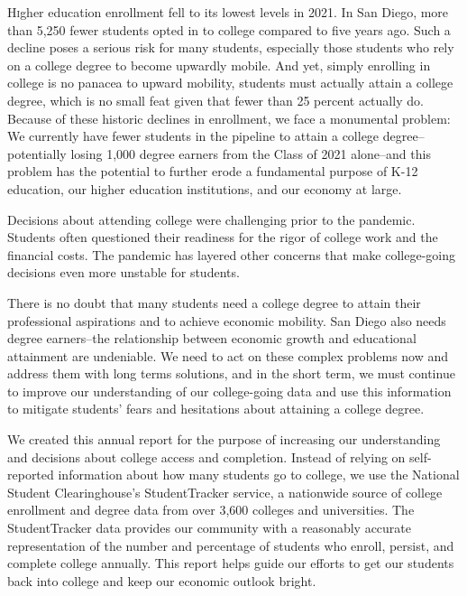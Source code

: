 \documentclass[
  11pt,
]{article}
\author{}
\date{\vspace{-2.5em}}
\begin{document}
\raggedright

\sdcoelogo{}

\vspace{5mm}

\vspace{5mm}
\begin{adjustwidth}{50pt}{50pt}
\lettrine[lines=3, lraise=0.2, nindent=0em, slope=0em]{H}igher education enrollment fell to its lowest levels in 2021. In San Diego, more than 5,250 fewer students opted in to college compared to five years ago. Such a decline poses a serious risk for many students, especially those students who rely on a college degree to become upwardly mobile. And yet, simply enrolling in college is no panacea to upward mobility, students must actually attain a college degree, which is no small feat given that fewer than 25 percent actually do. Because of these historic declines in enrollment, we face a monumental problem: We currently have fewer students in the pipeline to attain a college degree--potentially losing 1,000 degree earners from the Class of 2021 alone--and this problem has the potential to further erode a fundamental purpose of K-12 education, our higher education institutions, and our economy at large.

Decisions about attending college were challenging prior to the pandemic. Students often questioned their readiness for the rigor of college work and the financial costs. The pandemic has layered other concerns that make college-going decisions even more unstable for students. 

There is no doubt that many students need a college degree to attain their professional aspirations and to achieve economic mobility. San Diego also needs degree earners--the relationship between economic growth and educational attainment are undeniable. We need to act on these complex problems now and address them with long terms solutions, and in the short term, we must continue to improve our understanding of our college-going data and use this information to mitigate students' fears and hesitations about attaining a college degree.

We created this annual report for the purpose of increasing our understanding and decisions about college access and completion. Instead of relying on self-reported information about how many students go to college,  we use the National Student Clearinghouse's StudentTracker service, a nationwide source of college enrollment and degree data from over 3,600 colleges and universities. The StudentTracker data provides our community with a reasonably accurate representation of the number and percentage of students who enroll, persist, and complete college annually. This report helps guide our efforts to get our students back into college and keep our economic outlook bright.
\end{adjustwidth}
\end{document}
